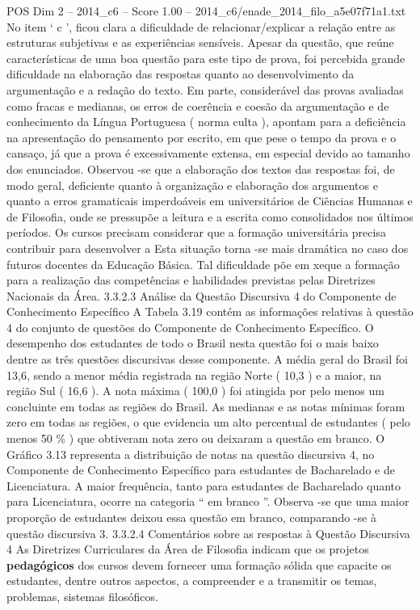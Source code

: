 \begin{textsample}{POS Dim 2 – 2014\_c6 – Score 1.00 – 2014\_c6/enade\_2014\_filo\_a5e07f71a1.txt}
No item ‘ c ’, ficou clara a dificuldade de relacionar/explicar a relação entre as estruturas subjetivas e as experiências sensíveis.
Apesar da questão, que reúne características de uma boa questão para este tipo de prova, foi percebida grande dificuldade na elaboração das respostas quanto ao desenvolvimento da argumentação e a redação do texto.
Em parte, considerável das provas avaliadas como fracas e medianas, os erros de coerência e coesão da argumentação e de conhecimento da Língua Portuguesa ( norma culta ), apontam para a deficiência na apresentação do pensamento por escrito, em que pese o tempo da prova e o cansaço, já que a prova é excessivamente extensa, em especial devido ao tamanho dos enunciados.
Observou -se que a elaboração dos textos das respostas foi, de modo geral, deficiente quanto à organização e elaboração dos argumentos e quanto a erros gramaticais imperdoáveis em universitários de Ciências Humanas e de Filosofia, onde se pressupõe a leitura e a escrita como consolidados nos últimos períodos.
Os cursos precisam considerar que a formação universitária precisa contribuir para desenvolver a Esta situação torna -se mais dramática no caso dos futuros docentes da Educação Básica.
Tal dificuldade põe em xeque a formação para a realização das competências e habilidades previstas pelas Diretrizes Nacionais da Área. 3.3.2.3 Análise da Questão Discursiva 4 do Componente de Conhecimento Específico A Tabela 3.19 contém as informações relativas à questão 4 do conjunto de questões do Componente de Conhecimento Específico.
O desempenho dos estudantes de todo o Brasil nesta questão foi o mais baixo dentre as três questões discursivas desse componente.
A média geral do Brasil foi 13,6, sendo a menor média registrada na região Norte ( 10,3 ) e a maior, na região Sul ( 16,6 ).
A nota máxima ( 100,0 ) foi atingida por pelo menos um concluinte em todas as regiões do Brasil.
As medianas e as notas mínimas foram zero em todas as regiões, o que evidencia um alto percentual de estudantes ( pelo menos 50 \% ) que obtiveram nota zero ou deixaram a questão em branco.
O Gráfico 3.13 representa a distribuição de notas na questão discursiva 4, no Componente de Conhecimento Específico para estudantes de Bacharelado e de Licenciatura.
A maior frequência, tanto para estudantes de Bacharelado quanto para Licenciatura, ocorre na categoria “ em branco ”.
Observa -se que uma maior proporção de estudantes deixou essa questão em branco, comparando -se à questão discursiva 3. 3.3.2.4 Comentários sobre as respostas à Questão Discursiva 4 As Diretrizes Curriculares da Área de Filosofia indicam que os projetos \textbf{pedagógicos} dos cursos devem fornecer uma formação sólida que capacite os estudantes, dentre outros aspectos, a compreender e a transmitir os temas, problemas, sistemas filosóficos.

\end{textsample}
